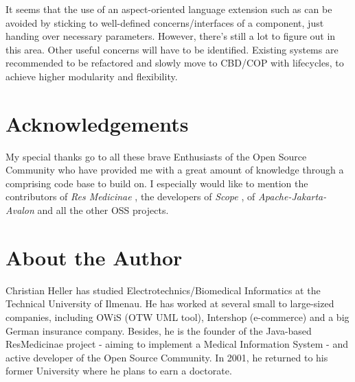 \documentclass[a4paper,10pt]{llncs}
\begin{document}
It seems that the use of an aspect-oriented language extension such as \cite{aspectj} can be avoided
by sticking to well-defined concerns/interfaces of a component, just handing over necessary parameters.
However, there's still a lot to figure out in this area. Other useful concerns will have to be identified.
Existing systems are recommended to be refactored and slowly move to CBD/COP with lifecycles,
to achieve higher modularity and flexibility.

%
%
\section{Acknowledgements}

My special thanks go to all these brave Enthusiasts of the Open Source Community
who have provided me with a great amount of knowledge through a comprising code base to build on.
I especially would like to mention the contributors of \emph{Res Medicinae} \cite{resmedicinae},
the developers of \emph{Scope} \cite{scope}, of \emph{Apache-Jakarta-Avalon} \cite{jakarta}
and all the other OSS projects.

%
%
\section{About the Author}

Christian Heller has studied Electrotechnics/Biomedical Informatics at the Technical University of Ilmenau.
He has worked at several small to large-sized companies, including OWiS (OTW UML tool),
Intershop (e-commerce) and a big German insurance company.
Besides, he is the founder of the Java-based ResMedicinae project
- aiming to implement a Medical Information System -
and active developer of the Open Source Community.
In 2001, he returned to his former University where he plans to earn a doctorate.

%
%

\label{references_heading}


\end{document}
